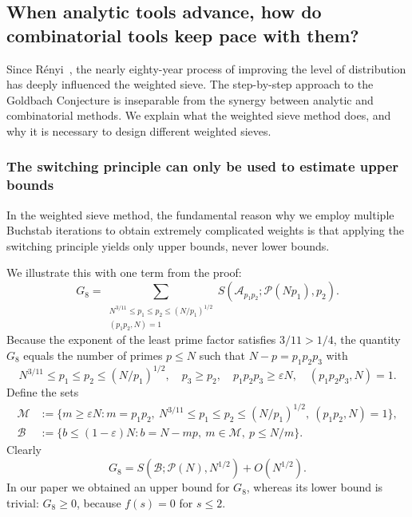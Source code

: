 \documentclass[12pt, a4paper]{amsart}
\def\le{\leqslant}
\def\ge{\geqslant}
\theoremstyle{plain}
\theoremstyle{remark}
\numberwithin{equation}{section}
\begin{document}
\subsection{When analytic tools advance, how do combinatorial tools keep pace with them?} 
Since R\'enyi~\cite{Ren48}, the nearly eighty-year process of improving the level of distribution has deeply influenced the weighted sieve. 
The step-by-step approach to the Goldbach Conjecture is inseparable from the synergy between analytic and combinatorial methods.
We explain what the weighted sieve method does, and why it is necessary to design different weighted sieves. 

\subsubsection{The switching principle can only be used to estimate upper bounds}
In the weighted sieve method, the fundamental reason why we employ multiple Buchstab iterations to obtain extremely complicated weights is that applying the switching principle yields only upper bounds, never lower bounds.

We illustrate this with one term from the proof:
\begin{equation}
G_8 = \sum_{\substack{N^{3/11} \le p_1 \le p_2 \le (N/p_1)^{1/2} \\ (p_1 p_2, N) = 1}} S(\mathscr{A}_{p_1 p_2}; \mathscr{P}(N p_1), p_2).
\end{equation}
Because the exponent of the least prime factor satisfies $3/11>1/4$, the quantity $G_8$ equals the number of primes $p\le N$ such that $N-p = p_1p_2p_3$ with
\begin{equation}
N^{3/11} \le p_1 \le p_2 \le (N/p_1)^{1/2},\quad p_3 \ge p_2,\quad p_1p_2p_3\ge \varepsilon N,\quad (p_1p_2p_3, N) = 1.
\end{equation}
Define the sets
\begin{equation}
\begin{aligned}
\mathscr{M} &:= \{ m\ge \varepsilon N : m = p_1p_2,\ N^{3/11} \le p_1 \le p_2 \le (N/p_1)^{1/2},\ (p_1p_2, N) = 1 \}, \\
\mathscr{B} &:= \{ b\le (1-\varepsilon) N : b = N - mp,\ m \in \mathscr{M},\ p \le N/m \}.
\end{aligned}
\end{equation}
Clearly
\[
G_8 = S(\mathscr{B}; \mathscr{P}(N), N^{1/2}) + O(N^{1/2}).
\]
In our paper we obtained an upper bound for $G_8$, whereas its lower bound is trivial: $G_8\ge 0$, because $f(s)=0$ for $s\le 2$.
\end{document}
